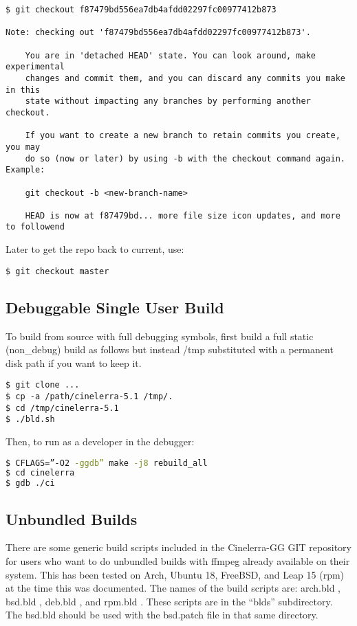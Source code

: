 \begin{lstlisting}
$ git checkout f87479bd556ea7db4afdd02297fc00977412b873

Note: checking out 'f87479bd556ea7db4afdd02297fc00977412b873'.

	You are in 'detached HEAD' state. You can look around, make experimental
	changes and commit them, and you can discard any commits you make in this
	state without impacting any branches by performing another checkout.

	If you want to create a new branch to retain commits you create, you may
	do so (now or later) by using -b with the checkout command again. Example:

  	git checkout -b <new-branch-name>

	HEAD is now at f87479bd... more file size icon updates, and more to followend
\end{lstlisting}

Later to get the repo back to current, use:    
\begin{lstlisting}
$ git checkout master
\end{lstlisting}


\subsection{Debuggable Single User Build}%
\label{sub:debuggable_single_user_build}


To build from source with full debugging symbols, first build a full static (non\_debug) build as follows but instead /tmp substituted with a permanent disk path if you want to keep it.

\begin{lstlisting}
$ git clone ...
$ cp -a /path/cinelerra-5.1 /tmp/.
$ cd /tmp/cinelerra-5.1
$ ./bld.sh
\end{lstlisting}


Then, to run as a developer in the debugger:

\begin{lstlisting}[language=bash]
$ CFLAGS=”-O2 -ggdb” make -j8 rebuild_all
$ cd cinelerra
$ gdb ./ci
\end{lstlisting}


\subsection{Unbundled Builds}%
\label{sub:unbundled_builds}

There are some generic build scripts included in the Cinelerra-GG GIT repository for users who want to do unbundled builds with ffmpeg already available on their system.  
This has been tested on Arch, Ubuntu 18, FreeBSD, and Leap 15 (rpm) at the time this was documented.  
The names of the build scripts are:  arch.bld ,  bsd.bld , deb.bld , and rpm.bld .  
These scripts are in the “blds” subdirectory.  
The bsd.bld should be used with the bsd.patch file in that same directory.


